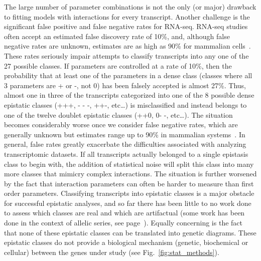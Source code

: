 The large number of parameter combinations is not the only (or major) drawback
to fitting models with interactions for every transcript. Another challenge is
the significant false positive and false negative rates for RNA-seq. RNA-seq
studies often accept an estimated false discovery rate of 10\%, and, although
false negative rates are unknown, estimates are as high as 90\% for mammalian
cells~\citep{Pimentel2016a}. These rates seriously impair attempts to classify
transcripts into any one of the 27 possible classes. If parameters are
controlled at a rate of 10\%, then the probability that at least one of the
parameters in a dense class (classes where all 3 parameters are + or -, not 0)
has been falsely accepted is almost 27\%. Thus, almost one in three of the
transcripts categorized into one of the 8 possible dense epistatic classes (+++,
- - -, ++-, etc\ldots) is misclassified and instead belongs to one of the twelve
doublet epistatic classes (++0, 0- -, etc\ldots). The situation becomes
considerably worse once we consider false negative rates, which are generally
unknown but estimates range up to 90\% in mammalian
systems~\citep{Pimentel2016a}. In general, false rates greatly exacerbate the
difficulties associated with analyzing transcriptomic datasets. If all
transcripts actually belonged to a single epistasis class to begin with, the
addition of statistical noise will split this class into many more classes that
mimicry complex interactions. The situation is further worsened by the fact that
interaction parameters can often be harder to measure than first order
parameters. Classifying transcripts into epistatic classes is a major obstacle
for successful epistatic analyses, and so far there has been little to no work
done to assess which classes are real and which are artifactual (some work has
been done in the context of allelic series, see
page~\pageref{sec:dominance_rev}). Equally concerning is the fact that none of
these epistatic classes can be translated into genetic diagrams. These epistatic
classes do not provide a biological mechanism (genetic, biochemical or cellular)
between the genes under study (see Fig.~\ref{fig:stat_methods}).

